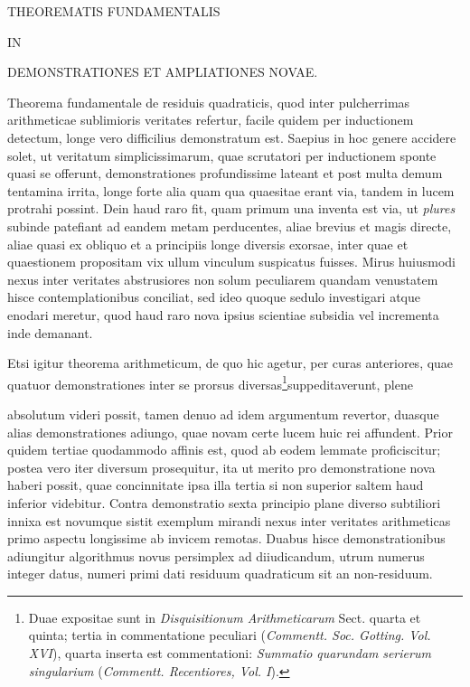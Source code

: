 \begin{center}
{\large THEOREMATIS FUNDAMENTALIS\par}
\smallskip IN\par
{}
\medskip DEMONSTRATIONES ET AMPLIATIONES NOVAE.\par
\end{center}
\BookRule{20mm}

Theorema fundamentale de residuis quadraticis, quod inter pulcherrimas arithmeticae sublimioris veritates refertur, facile quidem per inductionem detectum, longe vero difficilius demonstratum est. Saepius in hoc genere accidere solet, ut veritatum simplicissimarum, quae scrutatori per inductionem sponte quasi se offerunt, demonstrationes profundissime lateant et post multa demum tentamina irrita, longe forte alia quam qua quaesitae erant via, tandem in lucem protrahi possint. Dein haud raro fit, quam primum una inventa est via, ut \textit{plu}\textit{res} subinde patefiant ad eandem metam perducentes, aliae brevius et magis directe, aliae quasi ex obliquo et a principiis longe diversis exorsae, inter quae et quaestionem propositam vix ullum vinculum suspicatus fuisses. Mirus huiusmodi nexus inter veritates abstrusiores non solum peculiarem quandam venustatem hisce contemplationibus conciliat, sed ideo quoque sedulo investigari atque enodari meretur, quod haud raro nova ipsius scientiae subsidia vel incrementa inde demanant.

Etsi igitur theorema arithmeticum, de quo hic agetur, per curas anteriores, quae quatuor demonstrationes inter se prorsus diversas\begingroup\renewcommand{\thefootnote}{*)}\footnote{Duae expositae sunt in \textit{Disquisitionum Arithmeticarum} Sect. quarta et quinta; tertia in commentatione peculiari (\textit{Commentt. Soc. Gotting. Vol. XVI}), quarta inserta est commentationi: \textit{Summatio quarundam} \textit{serierum singularium} (\textit{Commentt. Recentiores, Vol. I}).}\endgroup suppeditaverunt, plene

absolutum videri possit, tamen denuo ad idem argumentum revertor, duasque alias demonstrationes adiungo, quae novam certe lucem huic rei affundent. Prior quidem tertiae quodammodo affinis est, quod ab eodem lemmate proficiscitur; postea vero iter diversum prosequitur, ita ut merito pro demonstratione nova haberi possit, quae concinnitate ipsa illa tertia si non superior saltem haud inferior videbitur. Contra demonstratio sexta principio plane diverso subtiliori innixa est novumque sistit exemplum mirandi nexus inter veritates arithmeticas primo aspectu longissime ab invicem remotas. Duabus hisce demonstrationibus adiungitur algorithmus novus persimplex ad diiudicandum, utrum numerus integer datus, numeri primi dati residuum quadraticum sit an non-residuum.


